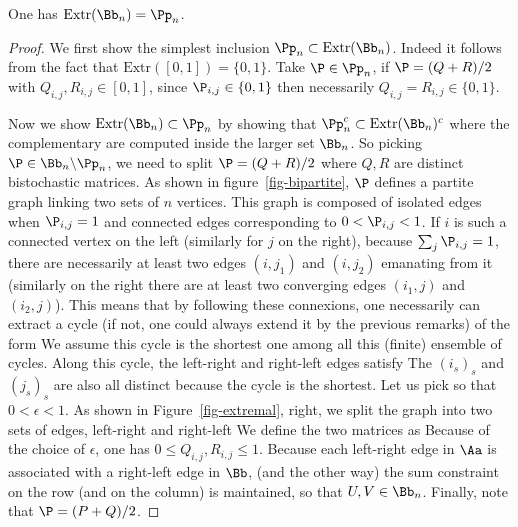 \begin{thm}\label{thm-birkh-vnm}
	One has $\text{Extr}(\Bb_n) = \Pp_n$.
\end{thm}
\begin{proof}
	We first show the simplest inclusion $\Pp_n \subset \text{Extr}(\Bb_n)$. Indeed it follows from the fact that $\text{Extr}([0,1]) = \{0,1\}$. Take $\P \in \Pp_n$, if $\P=(Q+R)/2$ with $Q_{i,j},R_{i,j} \in [0,1]$, since $\P_{i,j} \in \{0,1\}$ then necessarily $Q_{i,j}=R_{i,j} \in \{0,1\}$.
	
	Now we show $\text{Extr}(\Bb_n) \subset \Pp_n$ by showing that $\Pp_n^c \subset \text{Extr}(\Bb_n)^c$ where the complementary are computed inside the larger set $\Bb_n$. So picking $\P \in \Bb_n \backslash \Pp_n$, we need to split $\P = (Q+R)/2$ where $Q,R$ are distinct bistochastic matrices. 
	As shown in figure~\ref{fig-bipartite}, $\P$ defines a partite graph linking two sets of $n$ vertices. 
	This graph is composed of isolated edges when $\P_{i,j}=1$ and connected edges corresponding to $0 < \P_{i,j} <1$.
	If $i$ is such a connected vertex on the left (similarly for $j$ on the right), because $\sum_j \P_{i,j}=1$, there are necessarily at least two edges $(i,j_1)$ and $(i,j_2)$ emanating from it (similarly on the right there are at least two converging edges $(i_1,j)$ and $(i_2,j)$). This means that by following these connexions, one necessarily can extract a cycle (if not, one could always extend it by the previous remarks) of the form
	We assume this cycle is the shortest one among all this (finite) ensemble of cycles. Along this cycle, the left-right and right-left edges satisfy
	The $(i_s)_s$ and $(j_s)_s$ are also all distinct because the cycle is the shortest. Let us pick
	so that $0 < \epsilon < 1$. As shown in Figure~\ref{fig-extremal}, right, we split the graph into two sets of edges, left-right and right-left
	We define the two matrices as
	Because of the choice of $\epsilon$, one has $0 \leq Q_{i,j}, R_{i,j} \leq 1$.
	Because each left-right edge in $\Aa$ is associated with a right-left edge in $\Bb$, (and the other way) the
	sum constraint on the row (and on the column) is maintained, so that $U,V \in \Bb_n$. Finally, note that $\P=(P+Q)/2$.	
\end{proof}




